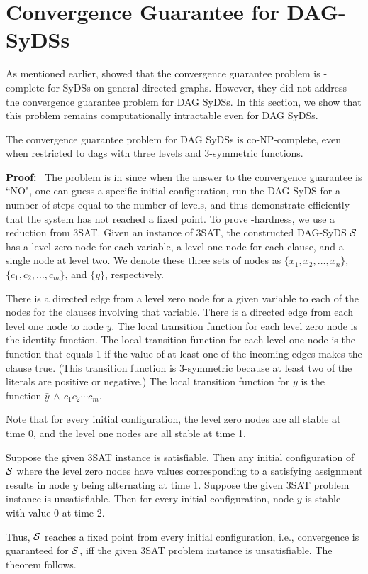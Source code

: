 \section{Convergence Guarantee for DAG-SyDSs}
\label{sec:conv_guarantee}

As mentioned earlier, \cite{Chistikov-etal-2020}
showed that the convergence
guarantee problem is \cpsp-complete for 
SyDSs on general directed graphs.
However, they did not address the convergence guarantee problem
for DAG SyDSs.
In this section, we show that this problem 
remains computationally intractable even for
DAG SyDSs. 

\begin{theorem}\label{thm:convergence_guaranee}
The convergence guarantee problem for DAG SyDSs is co-NP-complete,
even when restricted to dags with three levels and 3-symmetric functions.
\end{theorem}

\noindent
\textbf{Proof:}~ The problem is in \cconp{} since when the answer to the
convergence guarantee is ``NO", one can guess a specific initial configuration,
run the DAG SyDS for a number of steps equal to the number of levels, and
thus demonstrate efficiently that the system has not reached a fixed point.
To prove \cnp-hardness, we use a reduction from 3SAT.
Given an instance of 3SAT,
the constructed DAG-SyDS $\mbox{$\mathcal{S}$}$ has a level zero node for each variable, 
a level one node for each clause, and a single node at level two.
We denote these three sets of nodes as $\{x_1, x_2, \ldots , x_n\}$,
$\{c_1,c_2, \ldots , c_m\}$, and $\{y\}$, respectively.

There is a directed edge from a  level zero node for a given variable
to each of  the nodes for the clauses involving that variable.
There is a directed edge from each level one node to node $y$.  The
local transition function for each level zero node is the identity
function.  The local transition function for each level one node
is the function that equals 1
if the value of at least one of the incoming edges
makes the clause true.  (This transition function is 3-symmetric
because at least two of the literals are positive or negative.) The
local transition function for $y$ is the function 
$\bar{y} \, \wedge \, c_1 c_2 \cdots  c_{m}$.

Note that for every initial configuration, the level zero nodes are
all stable at time 0, and the level one nodes are all stable at
time 1.

Suppose the given 3SAT instance is satisfiable.
Then any initial configuration of $\mbox{$\mathcal{S}$}$ where the level zero nodes 
have values corresponding to a satisfying assignment
results in node $y$ being alternating at time 1.
Suppose the given 3SAT problem instance is unsatisfiable.
Then for every initial configuration, node $y$ is stable with value 0 at time 2.

\smallskip
Thus, $\mbox{$\mathcal{S}$}$ reaches a fixed point from every initial configuration, 
i.e.,  convergence is guaranteed for $\mbox{$\mathcal{S}$}$,
iff the given 3SAT problem instance is unsatisfiable.
The theorem follows.
\QED
